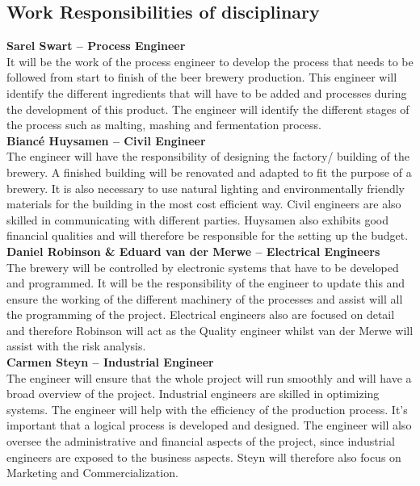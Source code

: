 \restoregeometry

\subsection{Work Responsibilities of disciplinary}

\textbf{Sarel Swart – Process Engineer}\\
\noindent
It will be the work of the process engineer to develop the process that needs to be followed from start to finish of the beer brewery production. This engineer will identify the different ingredients that will have to be added and processes during the development of this product. The engineer will identify the different stages of the process such as malting, mashing and fermentation process.\\

\noindent
\textbf{Biancé Huysamen – Civil Engineer}\\
\noindent
The engineer will have the responsibility of designing the factory/ building of the brewery. A finished building will be renovated and adapted to fit the purpose of a brewery. It is also necessary to use natural lighting and environmentally friendly materials for the building in the most cost efficient way. Civil engineers are also skilled in communicating with different parties. Huysamen also exhibits good financial qualities and will therefore be responsible for the setting up the budget.\\

\noindent
\textbf{Daniel Robinson \& Eduard van der Merwe – Electrical Engineers}\\
\noindent
The brewery will be controlled by electronic systems that have to be developed and programmed. It will be the responsibility of the engineer to update this and ensure the working of the different machinery of the processes and assist will all the programming of the project. Electrical engineers also are focused on detail and therefore Robinson will act as the Quality engineer whilst van der Merwe will assist with the risk analysis.\\

\noindent
\textbf{Carmen Steyn – Industrial Engineer}\\
\noindent
The engineer will ensure that the whole project will run smoothly and will have a broad overview of the project. Industrial engineers are skilled in optimizing systems. The engineer will help with the efficiency of the production process. It’s important that a logical process is developed and designed. The engineer will also oversee the administrative and financial aspects of the project, since industrial engineers are exposed to the business aspects. Steyn will therefore also focus on Marketing and Commercialization.\\

